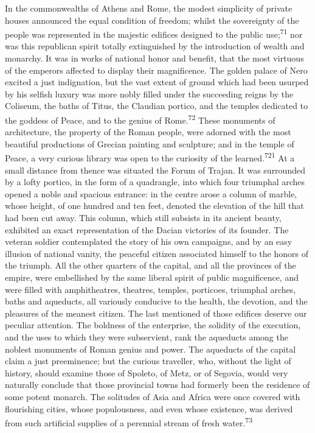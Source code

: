 
In the commonwealths of Athens and Rome, the modest simplicity of
private houses announced the equal condition of freedom; whilst
the sovereignty of the people was represented in the majestic
edifices designed to the public use;\textsuperscript{71} nor was this republican
spirit totally extinguished by the introduction of wealth and
monarchy. It was in works of national honor and benefit, that the
most virtuous of the emperors affected to display their
magnificence. The golden palace of Nero excited a just
indignation, but the vast extent of ground which had been usurped
by his selfish luxury was more nobly filled under the succeeding
reigns by the Coliseum, the baths of Titus, the Claudian portico,
and the temples dedicated to the goddess of Peace, and to the
genius of Rome.\textsuperscript{72} These monuments of architecture, the property
of the Roman people, were adorned with the most beautiful
productions of Grecian painting and sculpture; and in the temple
of Peace, a very curious library was open to the curiosity of the
learned.\textsuperscript{721} At a small distance from thence was situated the
Forum of Trajan. It was surrounded by a lofty portico, in the
form of a quadrangle, into which four triumphal arches opened a
noble and spacious entrance: in the centre arose a column of
marble, whose height, of one hundred and ten feet, denoted the
elevation of the hill that had been cut away. This column, which
still subsists in its ancient beauty, exhibited an exact
representation of the Dacian victories of its founder. The
veteran soldier contemplated the story of his own campaigns, and
by an easy illusion of national vanity, the peaceful citizen
associated himself to the honors of the triumph. All the other
quarters of the capital, and all the provinces of the empire,
were embellished by the same liberal spirit of public
magnificence, and were filled with amphitheatres, theatres,
temples, porticoes, triumphal arches, baths and aqueducts, all
variously conducive to the health, the devotion, and the
pleasures of the meanest citizen. The last mentioned of those
edifices deserve our peculiar attention. The boldness of the
enterprise, the solidity of the execution, and the uses to which
they were subservient, rank the aqueducts among the noblest
monuments of Roman genius and power. The aqueducts of the capital
claim a just preeminence; but the curious traveller, who, without
the light of history, should examine those of Spoleto, of Metz,
or of Segovia, would very naturally conclude that those
provincial towns had formerly been the residence of some potent
monarch. The solitudes of Asia and Africa were once covered with
flourishing cities, whose populousness, and even whose existence,
was derived from such artificial supplies of a perennial stream
of fresh water.\textsuperscript{73}


